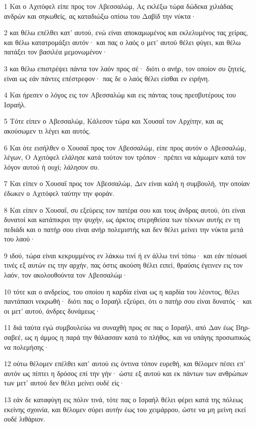 \par 1 Και ο Αχιτόφελ είπε προς τον Αβεσσαλώμ, Ας εκλέξω τώρα δώδεκα χιλιάδας ανδρών και σηκωθείς, ας καταδιώξω οπίσω του Δαβίδ την νύκτα·
\par 2 και θέλω επέλθει κατ' αυτού, ενώ είναι αποκαμωμένος και εκλελυμένος τας χείρας, και θέλω κατατρομάξει αυτόν· και πας ο λαός ο μετ' αυτού θέλει φύγει, και θέλω πατάξει τον βασιλέα μεμονωμένον·
\par 3 και θέλω επιστρέψει πάντα τον λαόν προς σέ· διότι ο ανήρ, τον οποίον συ ζητείς, είναι ως εάν πάντες επέστρεφον· πας δε ο λαός θέλει είσθαι εν ειρήνη.
\par 4 Και ήρεσεν ο λόγος εις τον Αβεσσαλώμ και εις πάντας τους πρεσβυτέρους του Ισραήλ.
\par 5 Τότε είπεν ο Αβεσσαλώμ, Κάλεσον τώρα και Χουσαΐ τον Αρχίτην, και ας ακούσωμεν τι λέγει και αυτός.
\par 6 Και ότε εισήλθεν ο Χουσαΐ προς τον Αβεσσαλώμ, είπε προς αυτόν ο Αβεσσαλώμ, λέγων, Ο Αχιτόφελ ελάλησε κατά τούτον τον τρόπον· πρέπει να κάμωμεν κατά τον λόγον αυτού ή ουχί; λάλησον συ.
\par 7 Και είπεν ο Χουσαΐ προς τον Αβεσσαλώμ, Δεν είναι καλή η συμβουλή, την οποίαν έδωκεν ο Αχιτόφελ ταύτην την φοράν.
\par 8 Και είπεν ο Χουσαΐ, συ εξεύρεις τον πατέρα σου και τους άνδρας αυτού, ότι είναι δυνατοί και κατάπικροι την ψυχήν, ως άρκτος στερηθείσα των τέκνων αυτής εν τη πεδιάδι και ο πατήρ σου είναι ανήρ πολεμιστής και δεν θέλει μείνει την νύκτα μετά του λαού·
\par 9 ιδού, τώρα είναι κεκρυμμένος εν λάκκω τινί ή εν άλλω τινί τόπω· και εάν πέσωσί τινές εξ αυτών εις την αρχήν, πας όστις ακούση θέλει ειπεί, θραύσις έγεινεν εις τον λαόν, τον ακολουθούντα τον Αβεσσαλώμ·
\par 10 τότε και ο ανδρείος, του οποίου η καρδία είναι ως η καρδία του λέοντος, θέλει παντάπασι νεκρωθή· διότι πας ο Ισραήλ εξεύρει, ότι ο πατήρ σου είναι δυνατός· και οι μετ' αυτού, άνδρες δυνάμεως·
\par 11 διά ταύτα εγώ συμβουλεύω να συναχθή προς σε πας ο Ισραήλ, από Δαν έως Βηρ-σαβεέ, ως η άμμος η παρά την θάλασσαν κατά το πλήθος, και να υπάγης προσωπικώς να πολεμήσης·
\par 12 ούτω θέλομεν επέλθει κατ' αυτού εις όντινα τόπον ευρεθή, και θέλομεν πέσει επ' αυτόν ως πίπτει η δρόσος επί την γήν· ώστε εξ αυτού και εκ πάντων των ανθρώπων των μετ' αυτού δεν θέλει μείνει ουδέ είς·
\par 13 εάν δε καταφύγη εις πόλιν τινά, τότε πας ο Ισραήλ θέλει φέρει κατά της πόλεως εκείνης σχοινία, και θέλομεν σύρει αυτήν έως του χειμάρρου, ώστε να μη μείνη εκεί ουδέ λιθάριον.
